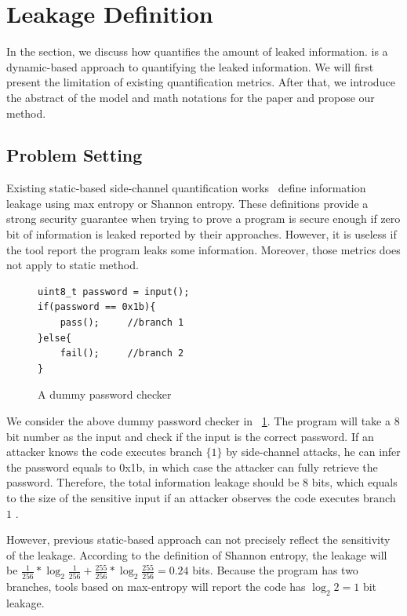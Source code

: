 \section{\tool{} Leakage Definition}
\label{trace_qif}
In the section, we discuss how \tool{} quantifies the amount of
leaked information. \tool{} is a dynamic-based approach to 
quantifying the leaked information. We will first present 
the limitation of existing quantification metrics. After
that, we introduce the abstract of the model and math notations 
for the paper and propose our method.

\subsection{Problem Setting}
Existing static-based side-channel quantification works~\cite{182946,Wichelmann:2018:MFF:3274694.3274741 } define information leakage
using max entropy or Shannon entropy. These definitions provide a strong security guarantee
when trying to prove a program is secure enough if zero bit of information is leaked 
reported by their approaches. However, it is useless if the tool report the program leaks
some information. Moreover, those metrics does not apply to static method.


\begin{figure}[h!]
    \centering
\begin{lstlisting}[xleftmargin=.03\textwidth,xrightmargin=.01\textwidth]
uint8_t password = input();
if(password == 0x1b){
    pass();     //branch 1
}else{
    fail();     //branch 2
}
\end{lstlisting}
\caption{A dummy password checker}
\label{figure:password checker}
\end{figure}

We consider the above dummy password checker in ~\ref{figure:password checker}.
The program will take a 8 bit number as the input and check if the input is the
correct password. 
If an attacker knows the
code executes branch $\{{1\}}$ by side-channel attacks, he can infer the password equals to 0x1b,
in which case the attacker can fully retrieve the password.
Therefore, the total information leakage should be 8 bits, which equals to the size
of the sensitive input if an attacker observes the code executes branch $1$ . 

However, previous static-based approach can not precisely reflect the sensitivity of the leakage.
According to the definition of Shannon entropy, the leakage will be $\frac{1}{256}*\log_{2}\frac{1}{256} + 
\frac{255}{256} *\log_{2}\frac{255}{256}= 0.24$ bits. Because the program has two branches, tools
based on max-entropy will report the code has $\log_2{2} = 1$ bit leakage.

